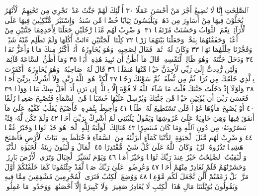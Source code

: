 ٱلصَّٰلِحَٰتِ إِنَّا لَا نُضِيعُ أَجْرَ مَنْ أَحْسَنَ عَمَلًا ٣٠ أُو۟لَٰٓئِكَ
لَهُمْ جَنَّٰتُ عَدْنࣲ تَجْرِي مِن تَحْتِهِمُ ٱلْأَنْهَٰرُ يُحَلَّوْنَ فِيهَا مِنْ أَسَاوِرَ
مِن ذَهَبࣲ وَيَلْبَسُونَ ثِيَابًا خُضْرࣰا مِّن سُندُسࣲ وَإِسْتَبْرَقࣲ مُّتَّكِـِٔينَ
فِيهَا عَلَى ٱلْأَرَآئِكِۚ نِعْمَ ٱلثَّوَابُ وَحَسُنَتْ مُرْتَفَقࣰا ٣١۞ وَٱضْرِبْ
لَهُم مَّثَلࣰا رَّجُلَيْنِ جَعَلْنَا لِأَحَدِهِمَا جَنَّتَيْنِ مِنْ أَعْنَٰبࣲ وَحَفَفْنَٰهُمَا
بِنَخْلࣲ وَجَعَلْنَا بَيْنَهُمَا زَرْعࣰا ٣٢ كِلْتَا ٱلْجَنَّتَيْنِ ءَاتَتْ أُكُلَهَا وَلَمْ
تَظْلِم مِّنْهُ شَيْـࣰٔاۚ وَفَجَّرْنَا خِلَٰلَهُمَا نَهَرࣰا ٣٣ وَكَانَ لَهُۥ ثَمَرࣱ فَقَالَ
لِصَٰحِبِهِۦ وَهُوَ يُحَاوِرُهُۥٓ أَنَا۠ أَكْثَرُ مِنكَ مَالࣰا وَأَعَزُّ نَفَرࣰا ٣٤
وَدَخَلَ جَنَّتَهُۥ وَهُوَ ظَالِمࣱ لِّنَفْسِهِۦ قَالَ مَآ أَظُنُّ أَن تَبِيدَ هَٰذِهِۦٓ
أَبَدࣰا ٣٥ وَمَآ أَظُنُّ ٱلسَّاعَةَ قَآئِمَةࣰ وَلَئِن رُّدِدتُّ إِلَىٰ رَبِّي لَأَجِدَنَّ
خَيْرࣰا مِّنْهَا مُنقَلَبࣰا ٣٦ قَالَ لَهُۥ صَاحِبُهُۥ وَهُوَ يُحَاوِرُهُۥٓ أَكَفَرْتَ
بِٱلَّذِي خَلَقَكَ مِن تُرَابࣲ ثُمَّ مِن نُّطْفَةࣲ ثُمَّ سَوَّىٰكَ رَجُلࣰا ٣٧
لَّٰكِنَّا۠ هُوَ ٱللَّهُ رَبِّي وَلَآ أُشْرِكُ بِرَبِّيٓ أَحَدࣰا ٣٨ وَلَوْلَآ إِذْ دَخَلْتَ
جَنَّتَكَ قُلْتَ مَا شَآءَ ٱللَّهُ لَا قُوَّةَ إِلَّا بِٱللَّهِۚ إِن تَرَنِ أَنَا۠ أَقَلَّ مِنكَ
مَالࣰا وَوَلَدࣰا ٣٩ فَعَسَىٰ رَبِّيٓ أَن يُؤْتِيَنِ خَيْرࣰا مِّن جَنَّتِكَ وَيُرْسِلَ
عَلَيْهَا حُسْبَانࣰا مِّنَ ٱلسَّمَآءِ فَتُصْبِحَ صَعِيدࣰا زَلَقًا ٤٠ أَوْ يُصْبِحَ
مَآؤُهَا غَوْرࣰا فَلَن تَسْتَطِيعَ لَهُۥ طَلَبࣰا ٤١ وَأُحِيطَ بِثَمَرِهِۦ
فَأَصْبَحَ يُقَلِّبُ كَفَّيْهِ عَلَىٰ مَآ أَنفَقَ فِيهَا وَهِيَ خَاوِيَةٌ عَلَىٰ
عُرُوشِهَا وَيَقُولُ يَٰلَيْتَنِي لَمْ أُشْرِكْ بِرَبِّيٓ أَحَدࣰا ٤٢ وَلَمْ تَكُن لَّهُۥ
فِئَةࣱ يَنصُرُونَهُۥ مِن دُونِ ٱللَّهِ وَمَا كَانَ مُنتَصِرًا ٤٣ هُنَالِكَ ٱلْوَلَٰيَةُ
لِلَّهِ ٱلْحَقِّۚ هُوَ خَيْرࣱ ثَوَابࣰا وَخَيْرٌ عُقْبࣰا ٤٤ وَٱضْرِبْ لَهُم مَّثَلَ ٱلْحَيَوٰةِ
ٱلدُّنْيَا كَمَآءٍ أَنزَلْنَٰهُ مِنَ ٱلسَّمَآءِ فَٱخْتَلَطَ بِهِۦ نَبَاتُ ٱلْأَرْضِ
فَأَصْبَحَ هَشِيمࣰا تَذْرُوهُ ٱلرِّيَٰحُۗ وَكَانَ ٱللَّهُ عَلَىٰ كُلِّ شَيْءࣲ مُّقْتَدِرًا ٤٥
ٱلْمَالُ وَٱلْبَنُونَ زِينَةُ ٱلْحَيَوٰةِ ٱلدُّنْيَاۖ وَٱلْبَٰقِيَٰتُ ٱلصَّٰلِحَٰتُ
خَيْرٌ عِندَ رَبِّكَ ثَوَابࣰا وَخَيْرٌ أَمَلࣰا ٤٦ وَيَوْمَ نُسَيِّرُ ٱلْجِبَالَ وَتَرَى
ٱلْأَرْضَ بَارِزَةࣰ وَحَشَرْنَٰهُمْ فَلَمْ نُغَادِرْ مِنْهُمْ أَحَدࣰا ٤٧ وَعُرِضُوا۟
عَلَىٰ رَبِّكَ صَفࣰّا لَّقَدْ جِئْتُمُونَا كَمَا خَلَقْنَٰكُمْ أَوَّلَ مَرَّةِۭۚ بَلْ زَعَمْتُمْ
أَلَّن نَّجْعَلَ لَكُم مَّوْعِدࣰا ٤٨ وَوُضِعَ ٱلْكِتَٰبُ فَتَرَى ٱلْمُجْرِمِينَ
مُشْفِقِينَ مِمَّا فِيهِ وَيَقُولُونَ يَٰوَيْلَتَنَا مَالِ هَٰذَا ٱلْكِتَٰبِ
لَا يُغَادِرُ صَغِيرَةࣰ وَلَا كَبِيرَةً إِلَّآ أَحْصَىٰهَاۚ وَوَجَدُوا۟ مَا عَمِلُوا۟
